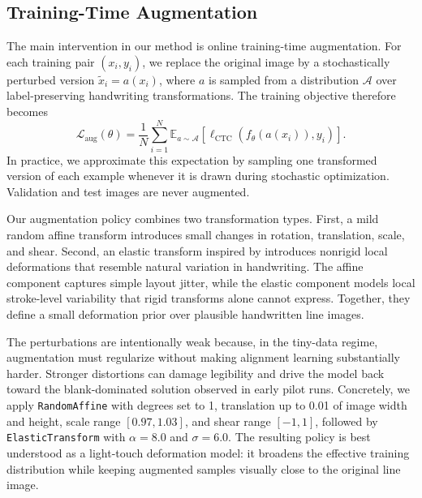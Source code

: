 \documentclass{article} %
\begin{document}
\subsection{Training-Time Augmentation}
The main intervention in our method is online training-time augmentation. For each training pair \((x_i, y_i)\), we replace the original image by a stochastically perturbed version \(\tilde{x}_i = a(x_i)\), where \(a\) is sampled from a distribution \(\mathcal{A}\) over label-preserving handwriting transformations. The training objective therefore becomes
\[
\mathcal{L}_{\mathrm{aug}}(\theta) = \frac{1}{N}\sum_{i=1}^{N} \mathbb{E}_{a \sim \mathcal{A}} \left[\ell_{\mathrm{CTC}}(f_\theta(a(x_i)), y_i)\right].
\]
In practice, we approximate this expectation by sampling one transformed version of each example whenever it is drawn during stochastic optimization. Validation and test images are never augmented.

Our augmentation policy combines two transformation types. First, a mild random affine transform introduces small changes in rotation, translation, scale, and shear. Second, an elastic transform inspired by \citet{simard2003best} introduces nonrigid local deformations that resemble natural variation in handwriting. The affine component captures simple layout jitter, while the elastic component models local stroke-level variability that rigid transforms alone cannot express. Together, they define a small deformation prior over plausible handwritten line images.

The perturbations are intentionally weak because, in the tiny-data regime, augmentation must regularize without making alignment learning substantially harder. Stronger distortions can damage legibility and drive the model back toward the blank-dominated solution observed in early pilot runs. Concretely, we apply \texttt{RandomAffine} with degrees set to 1, translation up to 0.01 of image width and height, scale range \([0.97, 1.03]\), and shear range \([-1, 1]\), followed by \texttt{ElasticTransform} with \(\alpha = 8.0\) and \(\sigma = 6.0\). The resulting policy is best understood as a light-touch deformation model: it broadens the effective training distribution while keeping augmented samples visually close to the original line image.
\end{document}
